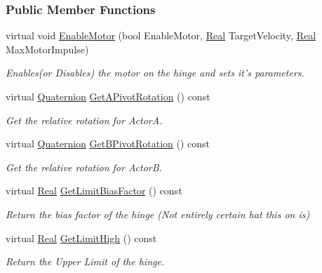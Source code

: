 \subsubsection*{Public Member Functions}
\begin{DoxyCompactItemize}
\item 
virtual void \hyperlink{classphys_1_1HingeConstraint_a90baa9ae0a582d42dc7757d14fd56299}{EnableMotor} (bool EnableMotor, \hyperlink{namespacephys_af7eb897198d265b8e868f45240230d5f}{Real} TargetVelocity, \hyperlink{namespacephys_af7eb897198d265b8e868f45240230d5f}{Real} MaxMotorImpulse)
\begin{DoxyCompactList}\small\item\em Enables(or Disables) the motor on the hinge and sets it's parameters. \item\end{DoxyCompactList}\item 
virtual \hyperlink{classphys_1_1Quaternion}{Quaternion} \hyperlink{classphys_1_1HingeConstraint_acc2a3459cfbfef7dc7a211e3e7569358}{GetAPivotRotation} () const 
\begin{DoxyCompactList}\small\item\em Get the relative rotation for ActorA. \item\end{DoxyCompactList}\item 
virtual \hyperlink{classphys_1_1Quaternion}{Quaternion} \hyperlink{classphys_1_1HingeConstraint_a4039ca63ae04464b6d29193348f1e1ee}{GetBPivotRotation} () const 
\begin{DoxyCompactList}\small\item\em Get the relative rotation for ActorB. \item\end{DoxyCompactList}\item 
virtual \hyperlink{namespacephys_af7eb897198d265b8e868f45240230d5f}{Real} \hyperlink{classphys_1_1HingeConstraint_a2c3b1f4f5242b35ddb9b9e9d00f76812}{GetLimitBiasFactor} () const 
\begin{DoxyCompactList}\small\item\em Return the bias factor of the hinge (Not entirely certain hat this on is) \item\end{DoxyCompactList}\item 
virtual \hyperlink{namespacephys_af7eb897198d265b8e868f45240230d5f}{Real} \hyperlink{classphys_1_1HingeConstraint_ae633b31c347af338042e87738d7694ff}{GetLimitHigh} () const 
\begin{DoxyCompactList}\small\item\em Return the Upper Limit of the hinge. \item\end{DoxyCompactList}\item 

\end{DoxyCompactItemize}
